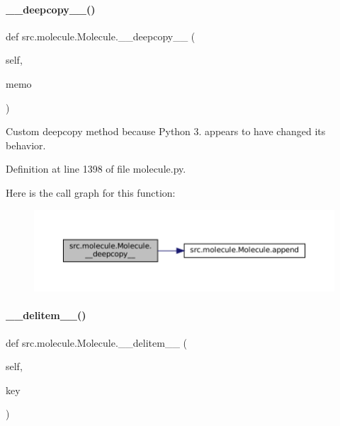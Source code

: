 \paragraph{\texorpdfstring{\+\_\+\+\_\+deepcopy\+\_\+\+\_\+()}{\_\_deepcopy\_\_()}}
{\footnotesize\ttfamily def src.\+molecule.\+Molecule.\+\_\+\+\_\+deepcopy\+\_\+\+\_\+ (\begin{DoxyParamCaption}\item[{}]{self,  }\item[{}]{memo }\end{DoxyParamCaption})}



Custom deepcopy method because Python 3. appears to have changed its behavior. 



Definition at line 1398 of file molecule.\+py.

Here is the call graph for this function\+:
\nopagebreak
\begin{figure}[H]
\begin{center}
\leavevmode
\includegraphics[width=350pt]{classsrc_1_1molecule_1_1Molecule_ac40e3fd2c1f79e316be59016e7dfd253_cgraph}
\end{center}
\end{figure}
\mbox{\label{classsrc_1_1molecule_1_1Molecule_a31014aa4ca1b8259557bedd6d13a51aa}} 
\paragraph{\texorpdfstring{\+\_\+\+\_\+delitem\+\_\+\+\_\+()}{\_\_delitem\_\_()}}
{\footnotesize\ttfamily def src.\+molecule.\+Molecule.\+\_\+\+\_\+delitem\+\_\+\+\_\+ (\begin{DoxyParamCaption}\item[{}]{self,  }\item[{}]{key }\end{DoxyParamCaption})}



